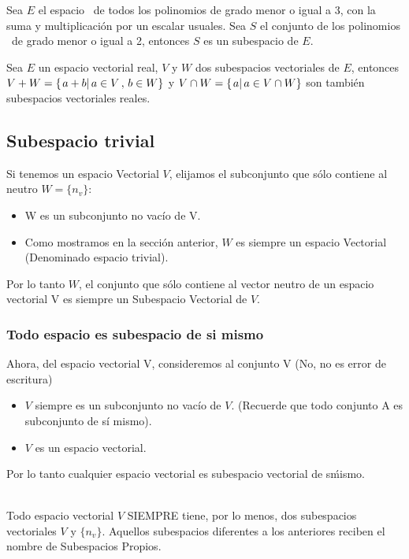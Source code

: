 \begin{ejemplo}
Sea $E$ el espacio \ptres \ de todos los polinomios de grado menor o igual a 3, con la suma y multiplicación por un escalar usuales. Sea $S$ el conjunto de los polinomios \pdos \ de grado menor o igual a 2, entonces $S$ es un subespacio de $E$.
\end{ejemplo}

\begin{ejemplo}

Sea $E$ un espacio vectorial real, $V$ y $W$ dos subespacios vectoriales de $E$, entonces $V + W =\left\{ \left. a+b\right| a \in V \, , \, b \in W \right\}$ y $V \cap W = \left\{ \left. a\right| a \in V \cap W \right\}$ son también subespacios vectoriales reales.
\end{ejemplo}



\subsection{Subespacio trivial}
Si tenemos un espacio Vectorial $V$, elijamos el subconjunto que s\'olo contiene al neutro
$W=\lbrace n_v\rbrace$:
~\\	
\begin{itemize}
 \item W es un subconjunto no vac\'io de V.
\item Como mostramos en la sección anterior, $W$ es siempre un espacio Vectorial (Denominado espacio trivial).
 \end{itemize} 
Por lo tanto $W$, el conjunto que s\'olo contiene al vector neutro de un espacio vectorial V es siempre un Subespacio Vectorial de $V$.
\subsubsection{Todo espacio es subespacio de si mismo}
Ahora, del espacio vectorial V, consideremos al conjunto V (No, no es error de escritura)
\begin{itemize}
\item $V$ siempre es un subconjunto no vac\'io de $V$. (Recuerde que todo conjunto A es subconjunto de s\'i mismo).
\item $V$ es un espacio vectorial.
\end{itemize}

Por lo tanto cualquier espacio vectorial es subespacio vectorial de s\' mismo.

~\\
Todo espacio vectorial $V$ SIEMPRE tiene, por lo menos, dos subespacios vectoriales $V$ y $\lbrace n_v\rbrace$. Aquellos subespacios diferentes a los anteriores reciben el nombre de Subespacios Propios.
~\\
